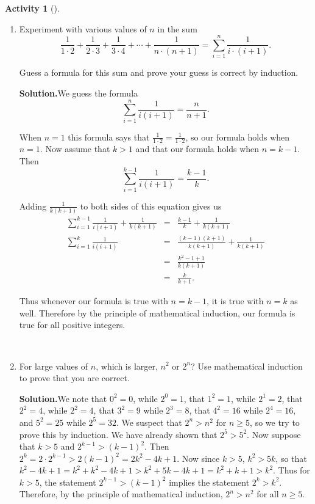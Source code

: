 \documentclass[10pt,]{book}
\theoremstyle{plain}
\theoremstyle{definition}
\newtheorem{activity}[project]{Activity}
\numberwithin{equation}{chapter}
\newcommand{\amp}{&}
\begin{document}
\begin{activity}[]
\begin{enumerate}[label=(\alph*)]
~\par
\item Experiment with various values of \(n\) in the sum%
\begin{equation*}
\frac{1}{1\cdot2}+\frac{1}{2\cdot3} + \frac{1}{3\cdot
4}+\cdots+\frac{1}{n\cdot (n+1)} = \sum_{i=1}^n \frac{1}{i\cdot(i+1)}.
\end{equation*}
%
\par
Guess a formula for this sum and prove your guess is correct by induction.%
\par\medskip\noindent%
\textbf{Solution.}\quad We guess the formula%
\begin{equation*}
\sum_{i=1}^n\frac{1}{i(i+1)} = \frac{n}{n+1}.
\end{equation*}
%
\par
When \(n=1\) this formula says that \(\frac{1}{1\cdot2}=\frac{1}{1\cdot
2}\), so our formula holds when \(n=1\). Now assume that \(k>1\) and that our formula holds when \(n=k-1\). Then%
\begin{equation*}
\sum_{i=1}^{k-1} \frac{1}{i(i+1)}= \frac{k-1}{k}.
\end{equation*}
%
\par
Adding \(\frac{1}{ k(k+1)}\) to both sides of this equation gives us%
\begin{align*}
\sum_{i=1}^{k-1} \frac{1}{i(i+1)}+\frac{1}{k(k+1)} \amp =\amp  \frac{k-1}{k}+\frac{1}{k(k+1)}\\
\sum_{i=1}^k \frac{1}{i(i+1)}\amp =\amp \frac{(k-1)(k+1)}{k(k+1)}+\frac{1}{k(k+1)}\\
\amp =\amp \frac{k^2 -1 +1}{k(k+1)}\\
\amp =\amp  \frac{k}{k+1}.
\end{align*}
%
\par
Thus whenever our formula is true with \(n=k-1\), it is true with \(n=k\) as well. Therefore by the principle of mathematical induction, our formula is true for all positive integers.%

~\par
\item For large values of \(n\), which is larger, \(n^2\) or \(2^n\)? Use mathematical induction to prove that you are correct.%
\par\medskip\noindent%
\textbf{Solution.}\quad We note that \(0^2=0\), while \(2^0=1\), that \(1^2=1\), while \(2^1=2\), that \(2^2=4\), while \(2^2=4\), that \(3^2=9\) while \(2^3=8\), that \(4^2=16\) while \(2^4=16\), and \(5^2=25\) while \(2^5=32\). We suspect that \(2^n>n^2\) for \(n\ge 5\), so we try to prove this by induction. We have already shown that \(2^5>5^2\). Now suppose that \(k>5\) and \(2^{k-1}>(k-1)^2\). Then \(2^k=2\cdot2^{k-1}>2(k-1)^2=2k^2-4k +1\). Now since \(k>5\), \(k^2>5k\), so that \(k^2-4k+1=k^2+k^2-4k+1>k^2+5k-4k+1=k^2+k+1>k^2\). Thus for \(k>5\), the statement \(2^{k-1}>(k-1)^2\) implies the statement \(2^k>k^2\). Therefore, by the principle of mathematical induction, \(2^n>n^2\) for all \(n\ge 5\).%


\end{enumerate}
\end{activity}
\end{document}
